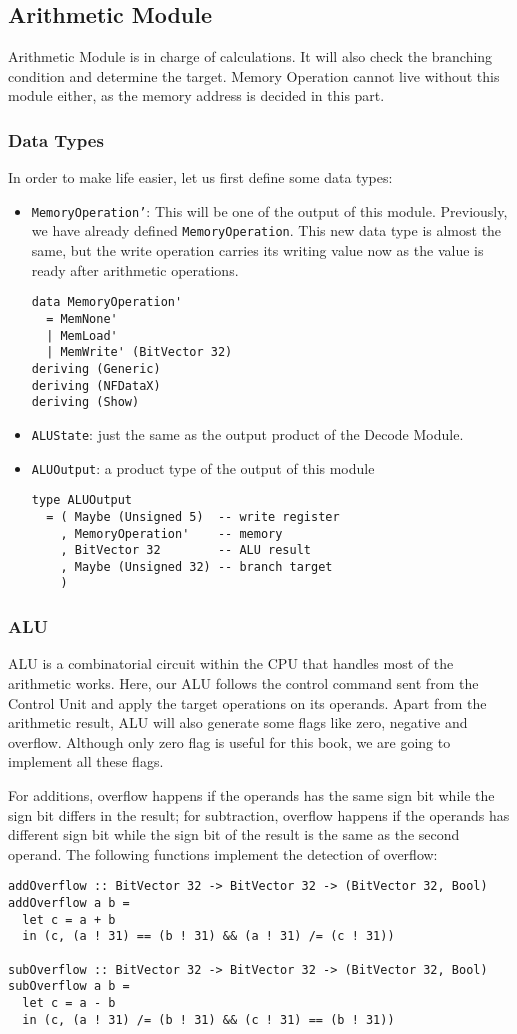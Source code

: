 \subsection{Arithmetic Module}
Arithmetic Module is in charge of calculations. It will also check the branching condition and determine the target. Memory Operation cannot live without this module either, as the memory address is decided in this part.
\subsubsection{Data Types}
In order to make life easier, let us first define some data types:
\begin{itemize}
\item \texttt{MemoryOperation'}: This will be one of the output of this module. Previously, we have already defined \texttt{MemoryOperation}. This new data type is almost the same, but the write operation carries its writing value now as the value is ready after arithmetic operations.
\begin{verbatim}
data MemoryOperation'
  = MemNone'
  | MemLoad'
  | MemWrite' (BitVector 32)
deriving (Generic)
deriving (NFDataX)
deriving (Show)
\end{verbatim}
\item  \texttt{ALUState}: just the same as the output product of the Decode Module.
\item  \texttt{ALUOutput}: a product type of the output of this module
\begin{verbatim}
type ALUOutput
  = ( Maybe (Unsigned 5)  -- write register
    , MemoryOperation'    -- memory
    , BitVector 32        -- ALU result
    , Maybe (Unsigned 32) -- branch target
    )
\end{verbatim}
\end{itemize}
\subsubsection{ALU}
ALU is a combinatorial circuit within the CPU that handles most of the arithmetic works. Here, our ALU follows the control command sent from the Control Unit and apply the target operations on its operands. Apart from the arithmetic result, ALU will also generate some flags like zero, negative and overflow. Although only zero flag is useful for this book, we are going to implement all these flags. 

For additions, overflow happens if the operands has the same sign bit while the sign bit differs in the result; for subtraction, overflow happens if the operands has different sign bit while the sign bit of the result is the same as the second operand. The following functions implement the detection of overflow:
\begin{verbatim}
addOverflow :: BitVector 32 -> BitVector 32 -> (BitVector 32, Bool)
addOverflow a b =
  let c = a + b
  in (c, (a ! 31) == (b ! 31) && (a ! 31) /= (c ! 31))

subOverflow :: BitVector 32 -> BitVector 32 -> (BitVector 32, Bool)
subOverflow a b =
  let c = a - b
  in (c, (a ! 31) /= (b ! 31) && (c ! 31) == (b ! 31))
\end{verbatim}


